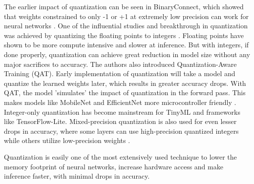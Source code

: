 \documentclass[conference]{IEEEtran}
\begin{document}
	The earlier impact of quantization can be seen in BinaryConnect, which showed that weights constrained to only -1 or +1 at extremely low precision can work for neural networks \cite{binarynet2015}. One of the influential studies and breakthrough in quantization was achieved by quantizing the floating points to integers \cite{quantization2018}. Floating points have shown to be more compute intensive and slower at inference. But with integers, if done properly, quantization can achieve great reduction in model size without any major sacrifices to accuracy. The authors also introduced Quantization-Aware Training (QAT). Early implementation of quantization will take a model and quantize the learned weights later, which results in greater accuracy drops. With QAT, the model 'simulates' the impact of quantization in the forward pass. This makes models like MobileNet and EfficientNet more microcontroller friendly \cite{quantization2018, han2015, lillo2024, mcunet2020, mcunet2021}. Integer-only quantization has become mainstream for TinyML and frameworks like TensorFlow-Lite. Mixed-precision quantization is also used for even lesser drops in accuracy, where some layers can use high-precision quantized integers while others utilize low-precision weights \cite{rusci2019}.
	
	Quantization is easily one of the most extensively used technique to lower the memory footprint of neural networks, increase hardware access and make inference faster, with minimal drops in accuracy.
	
\end{document}
